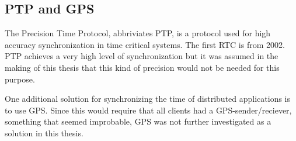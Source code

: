 \subsection{PTP and GPS}

The Precision Time Protocol, abbriviates PTP, is a protocol used for high accuracy synchronization in time critical systems. The first RTC is from 2002\cite{ptp}. PTP achieves a very high level of synchronization but it was assumed in the making of this thesis that this kind of precision would not be needed for this purpose. 

One additional solution for synchronizing the time of distributed applications is to use GPS. Since this would require that all clients had a GPS-sender/reciever, something that seemed improbable, GPS was not further investigated as a solution in this thesis. 
